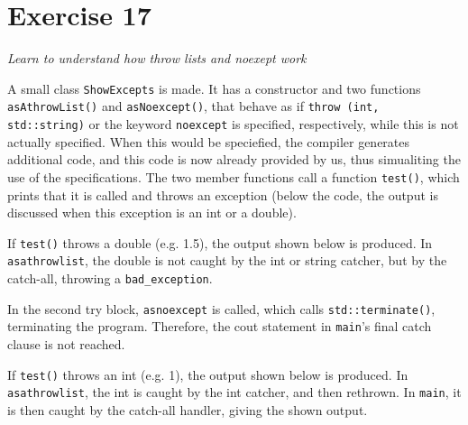 \documentclass[12pt]{article}
\newcommand{\desc}[1]{\textit{#1} \vspace{1em}}
\begin{document}
\clearpage
\section*{Exercise 17}
\desc{Learn to understand how throw lists and noexept work}

A small class \texttt{ShowExcepts} is made. It has a constructor and two functions \texttt{asAthrowList()} and \texttt{asNoexcept()}, that behave as if \texttt{throw (int, std::string)} or the keyword \texttt{noexcept} is specified, respectively, while this is not actually specified. When this would be speciefied, the compiler generates additional code, and this code is now already provided by us, thus simualiting the use of the specifications. 
The two member functions call a function \texttt{test()}, which prints that it is called and throws an exception (below the code, the output is discussed when this exception is an int or a double). 











If \texttt{test()} throws a double (e.g. 1.5), the output shown below is produced. In \texttt{asathrowlist}, the double is not caught by the int or string catcher, but by the catch-all, throwing a \texttt{bad\_exception}. 

In the second try block, \texttt{asnoexcept} is called, which calls \texttt{std::terminate()}, terminating the program. Therefore, the cout statement in \texttt{main}'s final catch clause is not reached. 



If \texttt{test()} throws an int (e.g. 1), the output shown below is produced. In \texttt{asathrowlist}, the int is caught by the int catcher, and then rethrown. In \texttt{main}, it is then caught by the catch-all handler, giving the shown output. 
\end{document}

